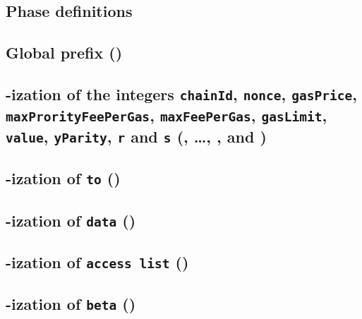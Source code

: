 \def\localSectionTitle {\rlp{}-ization of the integers \texttt{chainId}, \texttt{nonce}, \texttt{gasPrice}, \texttt{maxProrityFeePerGas}, \texttt{maxFeePerGas}, \texttt{gasLimit}, \texttt{value}, \texttt{yParity}, \texttt{r} and \texttt{s} }

\subsection{Phase definitions}                                                                    \label{rlp txn v2: phase constraints: definitions}    
\subsection{Global \rlp{} prefix (\phaseRlpPrefix)}                                               \label{rlp txn v2: phase constraints: rlp prefix}     
\subsection{\localSectionTitle{} (\phaseChainId{}, \dots, \phaseY{}, \phaseR{} and \phaseS{})}    \label{rlp txn v2: phase constraints: integers}       
\subsection{\rlp{}-ization of \texttt{to} (\phaseTo)}                                             \label{rlp txn v2: phase constraints: to address}         
\subsection{\rlp{}-ization of \texttt{data} (\phaseData)}                                         \label{rlp txn v2: phase constraints: payload}        
\subsection{\rlp{}-ization of \texttt{access list} (\phaseAccessList)}                            \label{rlp txn v2: phase constraints: access list}    
\subsection{\rlp{}-ization of \texttt{beta} (\phaseBeta)}                                         \label{rlp txn v2: phase constraints: beta}           
